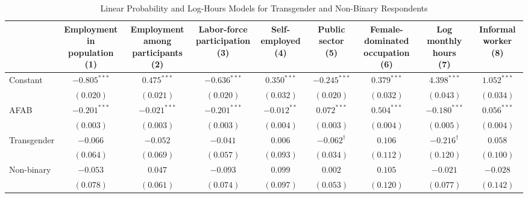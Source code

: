 \begin{table}[htpb]
\caption{Linear Probability and Log-Hours Models for Transgender and Non-Binary Respondents}
\label{tab:labor_trans_nb_full}
\centering
\begingroup\small
\renewcommand{\arraystretch}{0.9}
\begin{adjustbox}{max totalsize={\textwidth}{0.76\textheight},center}
\begin{tabular}{l c c c c c c c c}
\hline
 & \shortstack{Employment in\\population\\ (1)} & \shortstack{Employment among\\participants\\ (2)} & \shortstack{Labor-force\\participation\\ (3)} & \shortstack{Self-employed\\ (4)} & \shortstack{Public sector\\ (5)} & \shortstack{Female-dominated\\occupation\\ (6)} & \shortstack{Log monthly hours\\ (7)} & \shortstack{Informal worker\\ (8)} \\
\hline
Constant & ${-0.805}^{***}$ & ${0.475}^{***}$ & ${-0.636}^{***}$ & ${0.350}^{***}$ & ${-0.245}^{***}$ & ${0.379}^{***}$ & ${4.398}^{***}$ & ${1.052}^{***}$ \\
 & $(0.020)$ & $(0.021)$ & $(0.020)$ & $(0.032)$ & $(0.020)$ & $(0.032)$ & $(0.043)$ & $(0.034)$ \\
AFAB & ${-0.201}^{***}$ & ${-0.021}^{***}$ & ${-0.201}^{***}$ & ${-0.012}^{**}$ & ${0.072}^{***}$ & ${0.504}^{***}$ & ${-0.180}^{***}$ & ${0.056}^{***}$ \\
 & $(0.003)$ & $(0.003)$ & $(0.003)$ & $(0.004)$ & $(0.003)$ & $(0.004)$ & $(0.005)$ & $(0.004)$ \\
Transgender & ${-0.066}$ & ${-0.052}$ & ${-0.041}$ & ${0.006}$ & ${-0.062}^{\dagger}$ & ${0.106}$ & ${-0.216}^{\dagger}$ & ${0.058}$ \\
 & $(0.064)$ & $(0.069)$ & $(0.057)$ & $(0.093)$ & $(0.034)$ & $(0.112)$ & $(0.120)$ & $(0.100)$ \\
Non-binary & ${-0.053}$ & ${0.047}$ & ${-0.093}$ & ${0.099}$ & ${0.002}$ & ${0.105}$ & ${-0.021}$ & ${-0.028}$ \\
 & $(0.078)$ & $(0.061)$ & $(0.074)$ & $(0.097)$ & $(0.053)$ & $(0.120)$ & $(0.077)$ & $(0.142)$ \\

\end{tabular}
\end{adjustbox}
\end{table}
